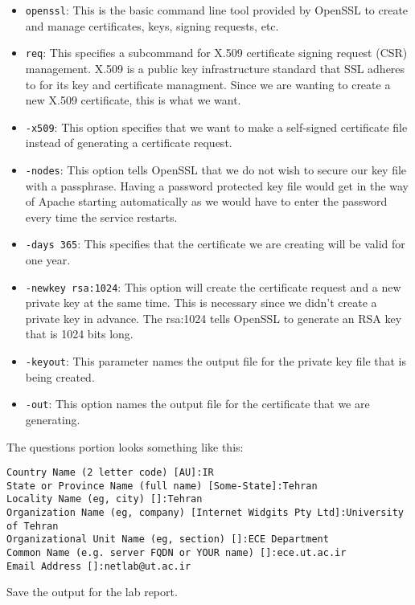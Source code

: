 \documentclass{../UTNetLab}
\begin{document}
		\begin{itemize}
			\item \lstinline{openssl}: This is the basic command line tool provided by OpenSSL to create and manage certificates, keys, signing requests, etc.
			\item \lstinline{req}: This specifies a subcommand for X.509 certificate signing request (CSR) management. X.509 is a public key infrastructure standard that SSL adheres to for its key and certificate managment. Since we are wanting to create a new X.509 certificate, this is what we want.
			\item \lstinline{-x509}: This option specifies that we want to make a self-signed certificate file instead of generating a certificate request.
			\item \lstinline{-nodes}: This option tells OpenSSL that we do not wish to secure our key file with a passphrase. Having a password protected key file would get in the way of Apache starting automatically as we would have to enter the password every time the service restarts.
			\item \lstinline{-days 365}: This specifies that the certificate we are creating will be valid for one year.
			\item \lstinline{-newkey rsa:1024}: This option will create the certificate request and a new private key at the same time. This is necessary since we didn't create a private key in advance. The rsa:1024 tells OpenSSL to generate an RSA key that is 1024 bits long.
			\item \lstinline{-keyout}: This parameter names the output file for the private key file that is being created.
			\item \lstinline{-out}: This option names the output file for the certificate that we are generating.	
		\end{itemize}

	The questions portion looks something like this:
	{\small
	\begin{verbatim}
Country Name (2 letter code) [AU]:IR 
State or Province Name (full name) [Some-State]:Tehran 
Locality Name (eg, city) []:Tehran 
Organization Name (eg, company) [Internet Widgits Pty Ltd]:University of Tehran 
Organizational Unit Name (eg, section) []:ECE Department 
Common Name (e.g. server FQDN or YOUR name) []:ece.ut.ac.ir 
Email Address []:netlab@ut.ac.ir 
	\end{verbatim}}

	Save the output for the lab report.
\end{document}
